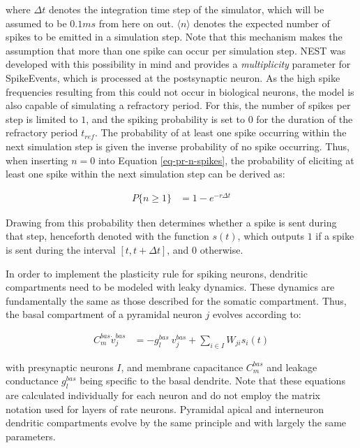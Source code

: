 where $\Delta t$ denotes the integration time step of the simulator, which will be assumed to be $0.1 ms$ from here on
out.  $\langle \textit{n} \rangle$ denotes the expected number of spikes to be emitted in a simulation step. Note that
this mechanism makes the assumption that more than one spike can occur per simulation step. NEST was developed with this
possibility in mind and provides a \textit{multiplicity} parameter for SpikeEvents, which is processed at the
postsynaptic neuron. As the high spike frequencies resulting from this could not occur in biological neurons, the model
is also capable of simulating a refractory period. For this, the number of spikes per step is limited to $1$, and the
spiking probability is set to 0 for the duration of the refractory period $t_{ref}$. The probability of at least one
spike occurring within the next simulation step is given the inverse probability of no spike occurring. Thus, when
inserting $n=0$ into Equation \ref{eq-pr-n-spikes}, the probability of eliciting at least one spike within the next
simulation step can be derived as:

\begin{align}
  P\{ \textit{n} \geq 1\} & = 1 - e^{-r \Delta t}
\end{align}


Drawing from this probability then determines whether a spike is sent during that step, henceforth denoted with
the function $s(t)$, which outputs $1$ if a spike is sent during the interval $[t, t+\Delta t]$, and $0$ otherwise.
\newline

In order to implement the plasticity rule for spiking neurons, dendritic compartments need to be modeled with leaky
dynamics. These dynamics are fundamentally the same as those described for the somatic compartment. Thus, the basal
compartment of a pyramidal neuron $j$ evolves according to:

\begin{align}
  C_m^{bas} \dot{v}_j^{bas} & = -g_l^{bas} \  v_j^{bas} + \sum_{i \in I} W_{ji} s_i(t)     \label{eq-spiking-basal-compartment}
\end{align}

with presynaptic neurons $I$, and membrane capacitance $C_m^{bas}$ and leakage conductance $g_l^{bas}$ being specific to
the basal dendrite. Note that these equations are calculated individually for each neuron and do not employ the matrix
notation used for layers of rate neurons. Pyramidal apical and interneuron dendritic compartments evolve by the same
principle and with largely the same parameters.

